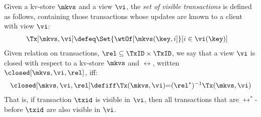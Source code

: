 Given a kv-store $\mkvs$ and a view $\vi$, the {\em set of visible
transactions} is defined as follows, containing those transactions whose updates are known to a
client with view $\vi$:
{%
\displaymathfont
\begin{align*}
\Tx[\mkvs, \vi] & \defeq
\Set{\wtOf[\mkvs(\key, i] }[ i \in \vi(\key)]
\end{align*}
}%
%
%
%
%
%
Given relation on transactions, $\rel \subseteq \TxID \times \TxID$, we say that a view $\vi$ is closed with respect to a kv-store $\mkvs$ and $\rel$, written $\closed[\mkvs,\vi,\rel]$, iff:  
{%
\displaymathfont
\begin{align*}
	\closed[\mkvs,\vi,\rel]
	\defiff
	\Tx(\mkvs, \vi) {=} 
	(\rel^*)^{-1} \Tx(\mkvs, \vi)
\end{align*}
}%
That is, if transaction $\txid$ is visible in $\vi$, then all transactions that are $\rel^*$-before $\txid$ are also visible in $\vi$.

